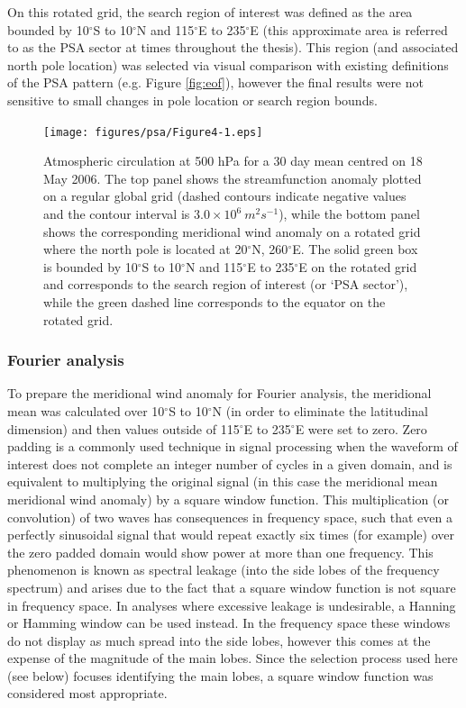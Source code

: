 On this rotated grid, the search region of interest was defined as the area bounded by 10$^{\circ}$S to 10$^{\circ}$N and 115$^{\circ}$E to 235$^{\circ}$E (this approximate area is referred to as the PSA sector at times throughout the thesis). This region (and associated north pole location) was selected via visual comparison with existing definitions of the PSA pattern (e.g. Figure \ref{fig:eof}), however the final results were not sensitive to small changes in pole location or search region bounds.

\begin{figure}
\begin{center}
\texttt{[image: figures/psa/Figure4-1.eps]}
\caption[Coordinate system rotation and corresponding 500 hPa meridional wind conversion for a 30 day mean centred on 18 May 2006]{\label{fig:rotation}
Atmospheric circulation at 500 hPa for a 30 day mean centred on 18 May 2006. The top panel shows the streamfunction anomaly plotted on a regular global grid (dashed contours indicate negative values and the contour interval is $3.0 \times 10^6 \: m^2 s^{-1}$), while the bottom panel shows the corresponding meridional wind anomaly on a rotated grid where the north pole is located at 20$^{\circ}$N, 260$^{\circ}$E. The solid green box is bounded by 10$^{\circ}$S to 10$^{\circ}$N and 115$^{\circ}$E to 235$^{\circ}$E on the rotated grid and corresponds to the search region of interest (or `PSA sector'), while the green dashed line corresponds to the equator on the rotated grid.%
}
\end{center}
\end{figure}

\subsubsection{Fourier analysis}

To prepare the meridional wind anomaly for Fourier analysis, the meridional mean was calculated over 10$^{\circ}$S to 10$^{\circ}$N (in order to eliminate the latitudinal dimension) and then values outside of 115$^{\circ}$E to 235$^{\circ}$E were set to zero. Zero padding is a commonly used technique in signal processing when the waveform of interest does not complete an integer number of cycles in a given domain, and is equivalent to multiplying the original signal (in this case the meridional mean meridional wind anomaly) by a square window function. This multiplication (or convolution) of two waves has consequences in frequency space, such that even a perfectly sinusoidal signal that would repeat exactly six times (for example) over the zero padded domain would show power at more than one frequency. This phenomenon is known as spectral leakage (into the side lobes of the frequency spectrum) and arises due to the fact that a square window function is not square in frequency space. In analyses where excessive leakage is undesirable, a Hanning or Hamming window can be used instead. In the frequency space these windows do not display as much spread into the side lobes, however this comes at the expense of the magnitude of the main lobes. Since the selection process used here (see below) focuses identifying the main lobes, a square window function was considered most appropriate.

